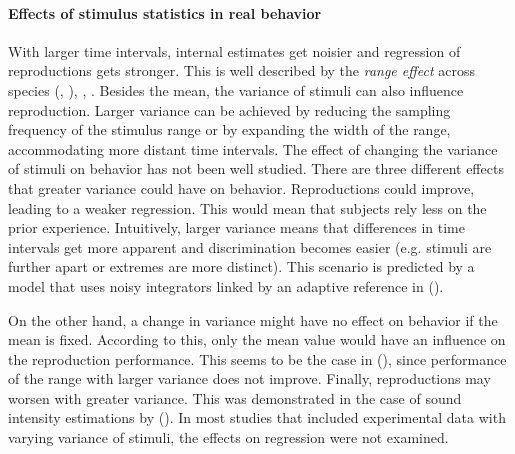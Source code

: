 \documentclass[10pt, a4paper]{article}
\begin{document}
\paragraph{Effects of stimulus statistics in real behavior}
With larger time intervals, internal estimates get noisier and regression of reproductions gets stronger. This is well described by the \textit{range effect} across species (\cite{Cicchini2012}, \cite{Sohn2019}), \cite{Henke2021}, \cite{Henke2022}. 
Besides the mean, the variance of stimuli can also influence reproduction.
Larger variance can be achieved by reducing the sampling frequency of the stimulus range or by expanding the width of the range, accommodating more distant time intervals. 
The effect of changing the variance of stimuli on behavior has not been well studied.
There are three different effects that greater variance could have on behavior. 
Reproductions could improve, leading to a weaker regression. This would mean that subjects rely less on the prior experience. 
Intuitively, larger variance means that differences in time intervals get more apparent and discrimination becomes easier (e.g. stimuli are further apart or extremes are more distinct). 
This scenario is predicted by a model that uses noisy integrators linked by an adaptive reference in \citeauthor{Thurley2016} (\citeyear{Thurley2016}).

On the other hand, a change in variance might have no effect on behavior if the mean is fixed. According to this, only the mean value would have an influence on the reproduction performance.
This seems to be the case in \citeauthor{Petzschner2012} (\citeyear{Petzschner2012}), since performance of the range with larger variance does not improve. 
Finally, reproductions may worsen with greater variance. This was demonstrated in the case of sound intensity estimations by \citeauthor{Teghtsoonian78} (\citeyear{Teghtsoonian78}).
In most studies that included experimental data with varying variance of stimuli, the effects on regression were not examined. 
\end{document}
